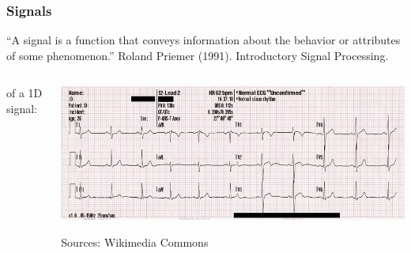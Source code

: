 \begin{frame}

    \frametitle{Signals}
    \begin{myDefinition}
        ``A signal is a function that conveys information about the behavior or attributes of some phenomenon.''\quad
        {\scriptsize
            Roland Priemer (1991). Introductory Signal Processing.
        }
    \end{myDefinition}
    \begin{columns}[c, onlytextwidth]
        \begin{column}{0.4\textwidth}
            \myExample{} of a 1D signal:
        \end{column}\begin{column}{0.6\textwidth}
            \includegraphics[height=.45\textheight ]{images/ecg}
            \begin{flushright}
                \scriptsize Sources: Wikimedia Commons
            \end{flushright}
        \end{column}
    \end{columns}

\end{frame}


